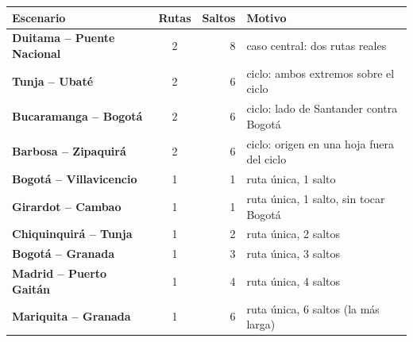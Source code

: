 \renewcommand{\arraystretch}{1.2}
\begin{tabular}{|l|c|r|>{\raggedright\arraybackslash}p{5.4cm}|}
\hline
\rowcolor{gray!20} \textbf{Escenario} & \textbf{Rutas} & \textbf{Saltos} & \textbf{Motivo} \\
\hline
\textbf{Duitama -- Puente Nacional} & 2 & 8 & caso central: dos rutas reales \\
\hline
\textbf{Tunja -- Ubaté} & 2 & 6 & ciclo: ambos extremos sobre el ciclo \\
\hline
\textbf{Bucaramanga -- Bogotá} & 2 & 6 & ciclo: lado de Santander contra Bogotá \\
\hline
\textbf{Barbosa -- Zipaquirá} & 2 & 6 & ciclo: origen en una hoja fuera del ciclo \\
\hline
\textbf{Bogotá -- Villavicencio} & 1 & 1 & ruta única, 1 salto \\
\hline
\textbf{Girardot -- Cambao} & 1 & 1 & ruta única, 1 salto, sin tocar Bogotá \\
\hline
\textbf{Chiquinquirá -- Tunja} & 1 & 2 & ruta única, 2 saltos \\
\hline
\textbf{Bogotá -- Granada} & 1 & 3 & ruta única, 3 saltos \\
\hline
\textbf{Madrid -- Puerto Gaitán} & 1 & 4 & ruta única, 4 saltos \\
\hline
\textbf{Mariquita -- Granada} & 1 & 6 & ruta única, 6 saltos (la más larga) \\
\hline
\end{tabular}
